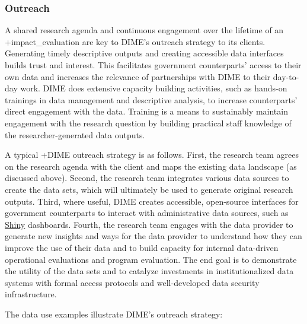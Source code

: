 \documentclass[
]{WileySix}
\begin{document}
\hypertarget{outreach-6}{%
\subsubsection{Outreach}\label{outreach-6}}

A shared research agenda and continuous engagement over the lifetime of an +impact\_evaluation\textbar{} are key to DIME's outreach strategy to its clients. Generating timely descriptive outputs and creating accessible data interfaces builds trust and interest. This facilitates government counterparts' access to their own data and increases the relevance of partnerships with DIME to their day-to-day work. DIME does extensive capacity building activities, such as hands-on trainings in data management and descriptive analysis, to increase counterparts' direct engagement with the data. Training is a means to sustainably maintain engagement with the research question by building practical staff knowledge of the researcher-generated data outputs.

A typical +DIME\textbar{} outreach strategy is as follows. First, the research team agrees on the research agenda with the client and maps the existing data landscape (as discussed above). Second, the research team integrates various data sources to create the data sets, which will ultimately be used to generate original research outputs. Third, where useful, DIME creates accessible, open-source interfaces for government counterparts to interact with administrative data sources, such as \href{https://shiny.rstudio.com/}{Shiny} dashboards. Fourth, the research team engages with the data provider to generate new insights and ways for the data provider to understand how they can improve the use of their data and to build capacity for internal data-driven operational evaluations and program evaluation. The end goal is to demonstrate the utility of the data sets and to catalyze investments in institutionalized data systems with formal access protocols and well-developed data security infrastructure.

The data use examples illustrate DIME's outreach strategy:
\end{document}
